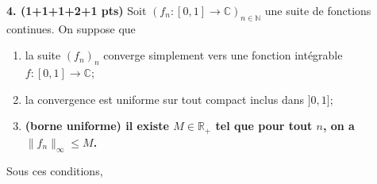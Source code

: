 \documentclass[a4paper,10pt]{article}
\newcommand{\N}{\mathbb{N}}
\newcommand{\R}{\mathbb{R}}
\newcommand{\C}{\mathbb{C}}
\newcommand{\norm}[1]{\|#1\|}
\begin{document}

\vspace{.1in}

\noindent
\textbf{4. (1+1+1+2+1 pts)}
Soit $(f_n:[0,1]\to\C)_{n\in\N}$ une suite de fonctions continues. On suppose que
\begin{enumerate}[label=\roman*)]
    \item la suite $(f_n)_n$ converge simplement vers une fonction intégrable $f:[0,1]\to\C$;
    \item la convergence est uniforme sur tout compact inclus dans $]0,1]$;
    \item \textbf{(borne uniforme) il existe $M\in\R_+$ tel que pour tout $n$, on a $\norm{f_n}_\infty\leq M$.}
\end{enumerate}
Sous ces conditions,
\end{document}
